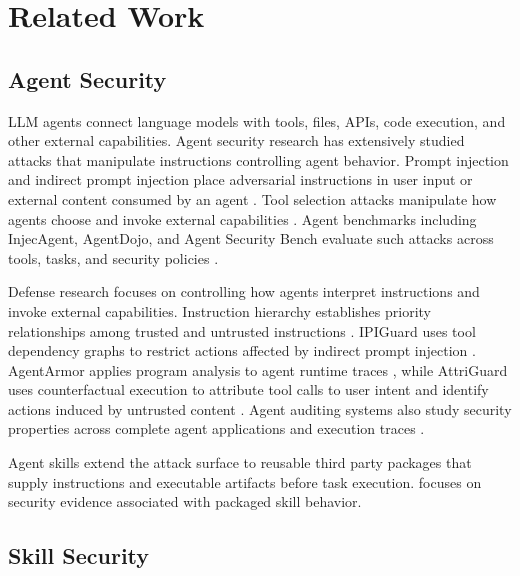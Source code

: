 \section{Related Work}
\label{sec:related-work}

\subsection{Agent Security}

LLM agents connect language models with tools, files, APIs, code execution,
and other external capabilities. Agent security research has extensively
studied attacks that manipulate instructions controlling agent behavior.
Prompt injection and indirect prompt injection place adversarial instructions
in user input or external content consumed by an agent
\cite{greshake2023notwhat,liu2024promptinjection,injecagent2024,
debenedetti2024agentdojo}. Tool selection attacks manipulate how agents choose
and invoke external capabilities \cite{toolhijacker2026}. Agent benchmarks
including InjecAgent, AgentDojo, and Agent Security Bench evaluate such attacks
across tools, tasks, and security policies
\cite{injecagent2024,debenedetti2024agentdojo,asb2024}.

Defense research focuses on controlling how agents interpret instructions and
invoke external capabilities. Instruction hierarchy establishes priority
relationships among trusted and untrusted instructions
\cite{wallace2024instructionhierarchy}. IPIGuard uses tool dependency graphs
to restrict actions affected by indirect prompt injection
\cite{ipiguard2025}. AgentArmor applies program analysis to agent runtime
traces \cite{wang2025agentarmor}, while AttriGuard uses counterfactual
execution to attribute tool calls to user intent and identify actions induced
by untrusted content \cite{he2026attriguard}. Agent auditing systems also study
security properties across complete agent applications and execution traces
\cite{agentaudit2026}.

Agent skills extend the attack surface to reusable third party packages that
supply instructions and executable artifacts before task execution. \system
focuses on security evidence associated with packaged skill behavior.


\subsection{Skill Security}

